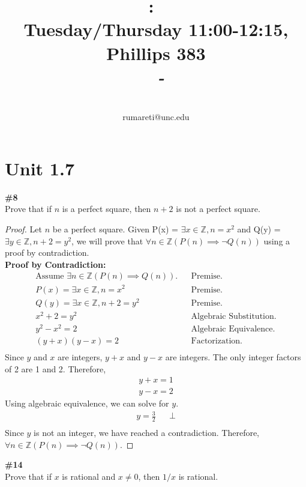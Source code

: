 \documentclass{article}
\title{
    \vspace{2in}
    \textmd{\textbf{\hmwkClass:\ \hmwkTitle}}\\
    \normalsize\vspace{0.1in}\small{Tuesday/Thursday 11:00-12:15, Phillips 383}\\
    \vspace{0.1in}\large{\textit{\hmwkClassInstructor\ - \hmwkClassTime}}
    \vspace{3in}
}
\author{\hmwkAuthorName\\\small{rumareti@unc.edu}}
\date{}
\newcommand{\unit}[1]{\section{Unit #1}}
\newcommand{\problem}[1]{\textbf{\##1}\\}
\newcommand{\AllIntegers}{\mathbb{Z}}
\begin{document}
\maketitle

\pagebreak

\unit{1.7}

\problem{8}
Prove that if \(n\) is a perfect square, then \(n + 2\) is not a perfect square.\\

\begin{proof}
    Let \(n\) be a perfect square. Given P(x) = \(\exists x \in \AllIntegers, n = x^2\) and Q(y) = \(\exists y \in \AllIntegers, n + 2 = y^2\), we will prove that \(\forall n \in \AllIntegers(P(n)\implies\neg Q(n))\) using a proof by contradiction.\\
    \textbf{Proof by Contradiction:}\\
    \begin{align*}
        \text{Assume } \exists n \in \AllIntegers(P(n) \implies Q(n)).&&\text{Premise.}\\
        P(x) = \exists x \in \AllIntegers, n = x^2&&\text{Premise.}\\
        Q(y) = \exists x \in \AllIntegers, n + 2 = y^2&&\text{Premise.}\\
        x^2 + 2 = y^2&&\text{Algebraic Substitution.}\\
        y^2 - x^2 = 2&&\text{Algebraic Equivalence.}\\
        (y + x)(y - x) = 2&&\text{Factorization.}\\
    \end{align*}
    Since \(y\) and \(x\) are integers, \(y + x\) and \(y - x\) are integers. The only integer factors of 2 are 1 and 2. Therefore,\\
    \begin{align*}
        y + x = 1\\
        y - x = 2
    \end{align*}
    Using algebraic equivalence, we can solve for \(y\).\\
    \begin{align*}
        y = \frac{3}{2}&&\bot\\
    \end{align*}
    Since \(y\) is not an integer, we have reached a contradiction. Therefore, \(\forall n \in \AllIntegers(P(n)\implies\neg Q(n))\).
\end{proof}

\pagebreak
\problem{14}
Prove that if \(x\) is rational and \(x \neq 0\), then \(1/x\) is rational.\\
\end{document}
